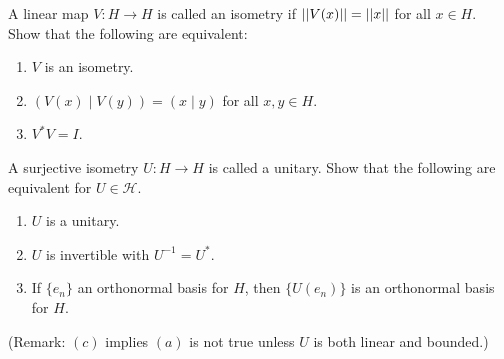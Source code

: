 \documentclass[12pt]{article}
\begin{document}
\begin{problem}{66}
    A linear map $V: H \to H$ is called an isometry if $\left\vert\left\vert V(x)\right\vert\right\vert = \left\vert\left\vert x\right\vert\right\vert$ for all $x \in H$. Show that the following are equivalent:
    \begin{enumerate}
        \item $V$ is an isometry.
        \item $(V(x) \mid V(y)) = (x \mid y)$ for all $x, y \in H$.
        \item $V^*V = I$.
    \end{enumerate}
\end{problem}
\begin{solution}

\end{solution}
\newpage

\begin{problem}{67}
    A surjective isometry $U: H \to H$ is called a unitary. Show that the following are equivalent for $U \in \mathcal{H}$. 
    \begin{enumerate}
        \item $U$ is a unitary.
        \item $U$ is invertible with $U^{-1} = U^*$.
        \item If $\{e_n\}$ an orthonormal basis for $H$, then $\{U(e_n)\}$ is an orthonormal basis for $H$.
    \end{enumerate}
    (Remark: $(c)$ implies $(a)$ is not true unless $U$ is both linear and bounded.)
\end{problem}
\begin{solution}

\end{solution}
\newpage
\end{document}
